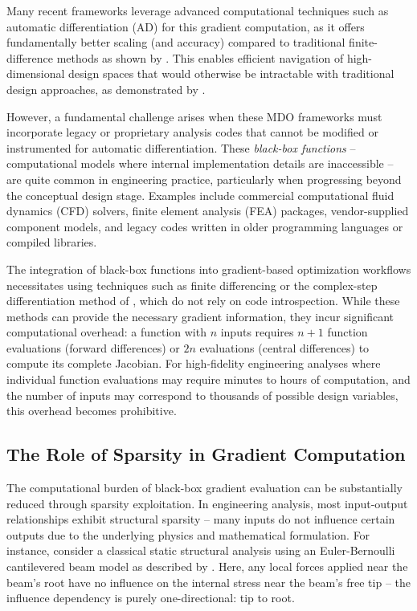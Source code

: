 \documentclass{article}
\begin{document}
Many recent frameworks leverage advanced computational techniques such as automatic differentiation (AD) for this gradient computation, as it offers fundamentally better scaling (and accuracy) compared to traditional finite-difference methods as shown by \cite{griewankAutomaticDifferentiation1988,rackauckasEngineeringTradeOffsAutomatic2021}. This enables efficient navigation of high-dimensional design spaces that would otherwise be intractable with traditional design approaches, as demonstrated by \cite{sharpeAcceleratingPracticalEngineering2024,sharpeAeroSandboxDifferentiableFramework2021}.

However, a fundamental challenge arises when these MDO frameworks must incorporate legacy or proprietary analysis codes that cannot be modified or instrumented for automatic differentiation. These \emph{black-box functions} -- computational models where internal implementation details are inaccessible -- are quite common in engineering practice, particularly when progressing beyond the conceptual design stage. Examples include commercial computational fluid dynamics (CFD) solvers, finite element analysis (FEA) packages, vendor-supplied component models, and legacy codes written in older programming languages or compiled libraries.

The integration of black-box functions into gradient-based optimization workflows necessitates using techniques such as finite differencing or the complex-step differentiation method of \cite{martinsComplexstepDerivativeApproximation2003}, which do not rely on code introspection. While these methods can provide the necessary gradient information, they incur significant computational overhead: a function with $n$ inputs requires $n+1$ function evaluations (forward differences) or $2n$ evaluations (central differences) to compute its complete Jacobian. For high-fidelity engineering analyses where individual function evaluations may require minutes to hours of computation, and the number of inputs may correspond to thousands of possible design variables, this overhead becomes prohibitive.

\subsection{The Role of Sparsity in Gradient Computation}

The computational burden of black-box gradient evaluation can be substantially reduced through sparsity exploitation. In engineering analysis, most input-output relationships exhibit structural sparsity -- many inputs do not influence certain outputs due to the underlying physics and mathematical formulation. For instance, consider a classical static structural analysis using an Euler-Bernoulli cantilevered beam model as described by \cite{drelaIntegratedSimulationModel1999}. Here, any local forces applied near the beam's root have no influence on the internal stress near the beam's free tip -- the influence dependency is purely one-directional: tip to root.
\end{document}
